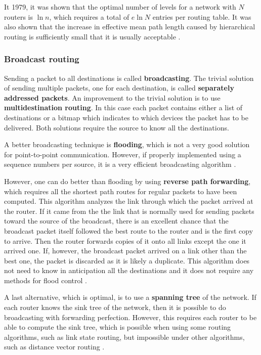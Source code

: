 It 1979, it was shown that the optimal number of levels for a network with \(N\) routers is \(\ln n\), which requires a total of \(e \ln N\) entries per routing table. It was also shown that the increase in effective mean path length caused by hierarchical routing is sufficiently small that it is usually acceptable \cite{kamoun-kleinrock-1976}.

\subsubsection{Broadcast routing}

Sending a packet to all destinations is called \textbf{broadcasting}.
The trivial solution of sending multiple packets, one for each destination, is called \textbf{separately addressed packets}.
An improvement to the trivial solution is to use \textbf{multidestination routing}.
In this case each packet contains either a list of destinations or a bitmap which indicates to which devices the packet has to be delivered. Both solutions require the source to know all the destinations.

A better broadcasting technique is \textbf{flooding}, which is not a very good solution for point-to-point communication. However, if properly implemented using a sequence numbers per source, it is a very efficient broadcasting algorithm \cite[p.~381]{computer-networks-tanenbaum-2012}.

However, one can do better than flooding by using \textbf{reverse path forwarding}, which requires all the shortest path routes for regular packets to have been computed. This algorithm analyzes the link through which the packet arrived at the router. If it came from the the link that is normally used for sending packets toward the source of the broadcast, there is an excellent chance that the broadcast packet itself followed the best route to the router and is the first copy to arrive. Then the router forwards copies of it onto all links except the one it arrived one. If, however, the broadcast packet arrived on a link other than the best one, the packet is discarded as it is likely a duplicate. This algorithm does not need to know in anticipation all the destinations and it does not require any methods for flood control \cite[p.~381]{computer-networks-tanenbaum-2012}.

A last alternative, which is optimal, is to use a \textbf{spanning tree} of the network. If each router knows the sink tree of the network, then it is possible to do broadcasting with forwarding perfection. However, this requires each router to be able to compute the sink tree, which is possible when using some routing algorithms, such as link state routing, but impossible under other algorithms, such as distance vector routing \cite[p.~382]{computer-networks-tanenbaum-2012}.

